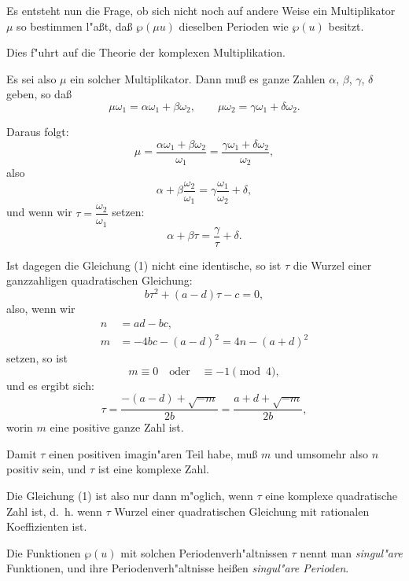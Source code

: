 \documentclass[11pt,a4paper]{article}
\theoremstyle{plain}
\begin{document}
Es entsteht nun die Frage, ob sich nicht noch auf andere Weise ein Multiplikator $\mu$ so bestimmen l"{a}\ss{}t, da\ss{} $\wp(\mu u)$ dieselben Perioden wie $\wp(u)$ besitzt.

Dies f"{u}hrt auf die Theorie der komplexen Multiplikation.

\smallskip

Es sei also $\mu$ ein solcher Multiplikator. Dann mu\ss{} es ganze Zahlen $\alpha$, $\beta$, $\gamma$, $\delta$ geben, so da\ss{}
\begin{equation}
\label{eq:114_1}
\mu\omega_1 = \alpha\omega_1 + \beta\omega_2, \qquad \mu\omega_2 = \gamma\omega_1 + \delta\omega_2.
\end{equation}

Daraus folgt:
\[
\mu = \frac{\alpha\omega_1 + \beta\omega_2}{\omega_1} = \frac{\gamma\omega_1 + \delta\omega_2}{\omega_2},
\]
also
\[
\alpha + \beta\frac{\omega_2}{\omega_1} = \gamma\frac{\omega_1}{\omega_2} + \delta,
\]
und wenn wir $\tau = \dfrac{\omega_2}{\omega_1}$ setzen:
\[
\alpha + \beta\tau = \frac{\gamma}{\tau} + \delta.
\]

\newpage
\setcounter{page}{414}

Ist dagegen die Gleichung (1) nicht eine identische, so ist $\tau$ die Wurzel einer ganzzahligen quadratischen Gleichung:
\begin{equation}
\label{eq:114_2}
b\tau^2 + (a - d)\tau - c = 0,
\end{equation}
also, wenn wir
\[
\begin{aligned}
n &= ad - bc,\\
m &= -4bc - (a-d)^2 = 4n - (a+d)^2
\end{aligned}
\]
setzen, so ist
\[
m \equiv 0 \quad \text{oder} \quad \equiv -1 \pmod{4},
\]
und es ergibt sich:
\[
\tau = \frac{-(a-d) + \sqrt{-m}}{2b} = \frac{a + d + \sqrt{-m}}{2b},
\]
worin $m$ eine positive ganze Zahl ist.

Damit $\tau$ einen positiven imagin"{a}ren Teil habe, mu\ss{} $m$ und umsomehr also $n$ positiv sein, und $\tau$ ist eine komplexe Zahl.

\smallskip

Die Gleichung (1) ist also nur dann m"{o}glich, wenn $\tau$ eine komplexe quadratische Zahl ist, d.~h. wenn $\tau$ Wurzel einer quadratischen Gleichung mit rationalen Koeffizienten ist.

\smallskip

Die Funktionen $\wp(u)$ mit solchen Periodenverh"{a}ltnissen $\tau$ nennt man \emph{singul"{a}re} Funktionen, und ihre Periodenverh"{a}ltnisse hei\ss{}en \emph{singul"{a}re Perioden}.
\end{document}
